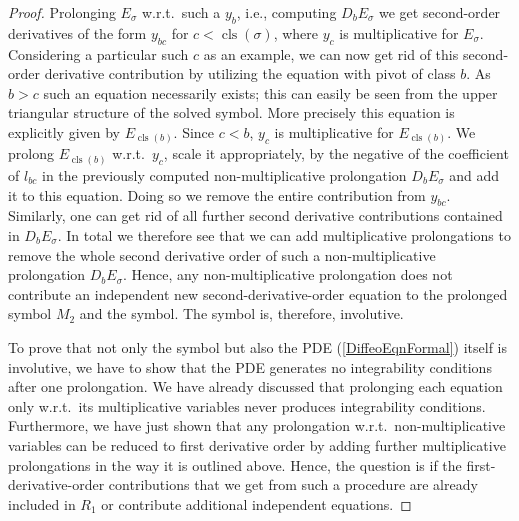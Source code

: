 \begin{proof}
Prolonging $E_{\sigma}$ w.r.t.\ such a $y_b$, i.e., computing $D_bE_{\sigma}$ we get second-order derivatives of the form $y_{bc}$ for $c < \operatorname{cls}(\sigma)$, where $y_c$ is multiplicative for $E_{\sigma}$. Considering a particular such $c$ as an example, we can now get rid of this second-order derivative contribution by utilizing the equation with pivot of class $b$. As $b>c$ such an equation necessarily exists; this can easily be seen from the upper triangular structure of the solved symbol. More precisely this equation is explicitly given by $E_{\operatorname{cls}(b)}$.
Since $c<b$, $y_c$ is multiplicative for $E_{\operatorname{cls}(b)}$. We prolong $E_{\operatorname{cls}(b)}$ w.r.t.\ $y_c$, scale it appropriately, by the negative of the coefficient of $l_{bc}$ in the previously computed non-multiplicative prolongation $D_bE_{\sigma}$ and add it to this equation. Doing so we remove the entire contribution from $y_{bc}$. Similarly, one can get rid of all further second derivative contributions contained in $D_bE_{\sigma}$. In total we therefore see that we can add multiplicative prolongations to remove the whole second derivative order of such a non-multiplicative prolongation $D_bE_{\sigma}$.
Hence, any non-multiplicative prolongation does not contribute an independent new second-derivative-order equation to the prolonged symbol $M_2$ and the symbol. The symbol is, therefore, involutive. 

To prove that not only the symbol but also the PDE (\ref{DiffeoEqnFormal}) itself is involutive, we have to show that the PDE generates no integrability conditions after one prolongation. We have already discussed that prolonging each equation only w.r.t.\ its multiplicative variables never produces integrability conditions. Furthermore, we have just shown that any prolongation w.r.t.\ non-multiplicative variables can be reduced to first derivative order by adding further multiplicative prolongations in the way it is outlined above. Hence, the question is if the first-derivative-order contributions that we get from such a procedure are already included in $R_1$ or contribute additional independent equations. 


\end{proof}
